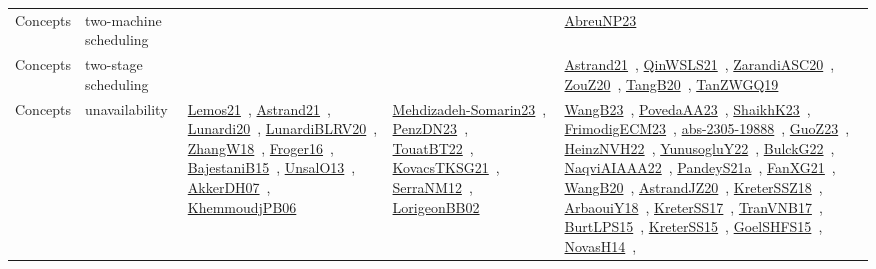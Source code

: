 {\begin{longtable}{lp{3cm}>{\raggedright\arraybackslash}p{6cm}>{\raggedright\arraybackslash}p{6cm}>{\raggedright\arraybackslash}p{8cm}}
\index{two-machine scheduling}\index{Concepts!two-machine scheduling}Concepts & two-machine scheduling &  &  & \href{../works/AbreuNP23.pdf}{AbreuNP23}~\cite{AbreuNP23}\\
\index{two-stage scheduling}\index{Concepts!two-stage scheduling}Concepts & two-stage scheduling &  &  & \href{../works/Astrand21.pdf}{Astrand21}~\cite{Astrand21}, \href{../works/QinWSLS21.pdf}{QinWSLS21}~\cite{QinWSLS21}, \href{../works/ZarandiASC20.pdf}{ZarandiASC20}~\cite{ZarandiASC20}, \href{../works/ZouZ20.pdf}{ZouZ20}~\cite{ZouZ20}, \href{../works/TangB20.pdf}{TangB20}~\cite{TangB20}, \href{../works/TanZWGQ19.pdf}{TanZWGQ19}~\cite{TanZWGQ19}\\
\index{unavailability}\index{Concepts!unavailability}Concepts & unavailability & \href{../works/Lemos21.pdf}{Lemos21}~\cite{Lemos21}, \href{../works/Astrand21.pdf}{Astrand21}~\cite{Astrand21}, \href{../works/Lunardi20.pdf}{Lunardi20}~\cite{Lunardi20}, \href{../works/LunardiBLRV20.pdf}{LunardiBLRV20}~\cite{LunardiBLRV20}, \href{../works/ZhangW18.pdf}{ZhangW18}~\cite{ZhangW18}, \href{../works/Froger16.pdf}{Froger16}~\cite{Froger16}, \href{../works/BajestaniB15.pdf}{BajestaniB15}~\cite{BajestaniB15}, \href{../works/UnsalO13.pdf}{UnsalO13}~\cite{UnsalO13}, \href{../works/AkkerDH07.pdf}{AkkerDH07}~\cite{AkkerDH07}, \href{../works/KhemmoudjPB06.pdf}{KhemmoudjPB06}~\cite{KhemmoudjPB06} & \href{../works/Mehdizadeh-Somarin23.pdf}{Mehdizadeh-Somarin23}~\cite{Mehdizadeh-Somarin23}, \href{../works/PenzDN23.pdf}{PenzDN23}~\cite{PenzDN23}, \href{../works/TouatBT22.pdf}{TouatBT22}~\cite{TouatBT22}, \href{../works/KovacsTKSG21.pdf}{KovacsTKSG21}~\cite{KovacsTKSG21}, \href{../works/SerraNM12.pdf}{SerraNM12}~\cite{SerraNM12}, \href{../works/LorigeonBB02.pdf}{LorigeonBB02}~\cite{LorigeonBB02} & \href{../works/WangB23.pdf}{WangB23}~\cite{WangB23}, \href{../works/PovedaAA23.pdf}{PovedaAA23}~\cite{PovedaAA23}, \href{../works/ShaikhK23.pdf}{ShaikhK23}~\cite{ShaikhK23}, \href{../works/FrimodigECM23.pdf}{FrimodigECM23}~\cite{FrimodigECM23}, \href{../works/abs-2305-19888.pdf}{abs-2305-19888}~\cite{abs-2305-19888}, \href{../works/GuoZ23.pdf}{GuoZ23}~\cite{GuoZ23}, \href{../works/HeinzNVH22.pdf}{HeinzNVH22}~\cite{HeinzNVH22}, \href{../works/YunusogluY22.pdf}{YunusogluY22}~\cite{YunusogluY22}, \href{../works/BulckG22.pdf}{BulckG22}~\cite{BulckG22}, \href{../works/NaqviAIAAA22.pdf}{NaqviAIAAA22}~\cite{NaqviAIAAA22}, \href{../works/PandeyS21a.pdf}{PandeyS21a}~\cite{PandeyS21a}, \href{../works/FanXG21.pdf}{FanXG21}~\cite{FanXG21}, \href{../works/WangB20.pdf}{WangB20}~\cite{WangB20}, \href{../works/AstrandJZ20.pdf}{AstrandJZ20}~\cite{AstrandJZ20}, \href{../works/KreterSSZ18.pdf}{KreterSSZ18}~\cite{KreterSSZ18}, \href{../works/ArbaouiY18.pdf}{ArbaouiY18}~\cite{ArbaouiY18}, \href{../works/KreterSS17.pdf}{KreterSS17}~\cite{KreterSS17}, \href{../works/TranVNB17.pdf}{TranVNB17}~\cite{TranVNB17}, \href{../works/BurtLPS15.pdf}{BurtLPS15}~\cite{BurtLPS15}, \href{../works/KreterSS15.pdf}{KreterSS15}~\cite{KreterSS15}, \href{../works/GoelSHFS15.pdf}{GoelSHFS15}~\cite{GoelSHFS15}, \href{../works/NovasH14.pdf}{NovasH14}~\cite{NovasH14}, 
\end{longtable}}
